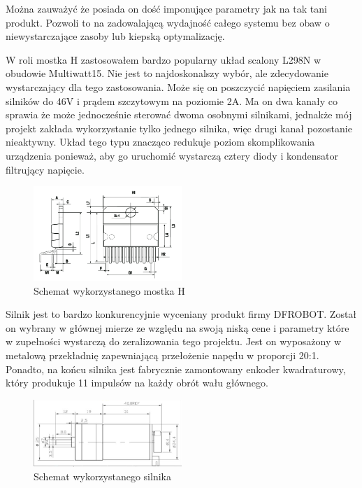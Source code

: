 \documentclass[eng, 11pt, twoside, openany]{mgr}
\begin{document}
        Można zauważyć że posiada on dość imponujące parametry 
        jak na tak tani produkt. Pozwoli to na zadowalającą wydajność
        całego systemu bez obaw o niewystarczające zasoby lub 
        kiepską optymalizację.

        W roli mostka H zastosowałem bardzo popularny układ scalony
        L298N w obudowie Multiwatt15. Nie jest to najdoskonalszy wybór,
        ale zdecydowanie wystarczający dla tego zastosowania. 
        Może się on poszczycić napięciem zasilania silników do 46V i 
        prądem szczytowym na poziomie 2A. Ma on dwa kanały co sprawia że
        może jednocześnie sterować dwoma osobnymi silnikami, jednakże
        mój projekt zakłada wykorzystanie tylko jednego silnika, więc 
        drugi kanał pozostanie nieaktywny. Układ tego typu znacząco
        redukuje poziom skomplikowania urządzenia ponieważ, aby
        go uruchomić wystarczą cztery diody i kondensator filtrujący 
        napięcie. \cite{mostek}


        \begin{figure}[ht]
          \centering
          \includegraphics[width=0.5\textwidth]{img/h_bridge.png}
          \caption{Schemat wykorzystanego mostka H}
        \end{figure}


        Silnik jest to bardzo konkurencyjnie wyceniany produkt 
        firmy DFROBOT. Został on wybrany w głównej mierze
        ze względu na swoją niską cene i parametry które w zupełności
        wystarczą do zeralizowania tego projektu.
        Jest on wyposażony w metalową przekładnię zapewniającą
        przełożenie napędu w proporcji 20:1. Ponadto, na końcu
        silnika jest fabrycznie zamontowany enkoder kwadraturowy,
        który produkuje 11 impulsów na każdy obrót wału głównego.
  

        \begin{figure}[ht]
          \centering
          \includegraphics[width=0.5\textwidth]{img/silnik.png}
          \caption{Schemat wykorzystanego silnika}
        \end{figure}
\end{document}
